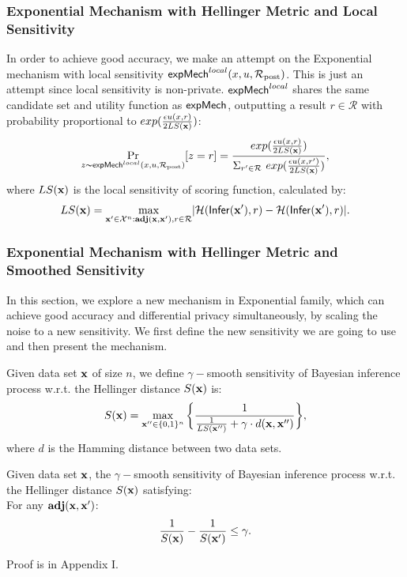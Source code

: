 \documentclass{article}
\begin{document}
\subsubsection{Exponential Mechanism with Hellinger Metric and Local Sensitivity}
\label{subsec_emls}
In order to achieve good accuracy, we make an attempt on the Exponential mechanism with local sensitivity $\mathsf{expMech}^{local}(x,u,\mathcal{R}_{\textup{post}})$. This is just an attempt since local sensitivity is non-private. $\mathsf{expMech}^{local}$ shares the same candidate set and utility function as $\mathsf{expMech}$, outputting a result $r \in \mathcal{R}$ with probability proportional to $exp(\frac{\epsilon u(x,r)}{2 LS(\textbf{x})})$:
\[
\underset{z \thicksim \mathsf{expMech}^{local}(x,u,\mathcal{R}_{\textup{post}})}{\Pr}[z=r] = \frac
{exp(\frac{\epsilon u(x,r)}{2 LS(\textbf{x})})}
{\Sigma_{r' \in \mathcal{R}}\ exp(\frac{\epsilon u(x,r')}{2 LS(\textbf{x})})},
\]
where $LS(\textbf{x})$ is the local sensitivity of scoring function, calculated by:
\begin{equation*}
LS(\textbf{x})=\max_{\textbf{x}' \in \mathcal{X}^n: \\ \textbf{adj}(\textbf{x},\textbf{x}'), r\in \mathcal{R}}\lvert \mathcal{H}(\mathsf{Infer}(\textbf{x}'), r) - \mathcal{H}(\mathsf{Infer}(\textbf{x}'), r)\rvert.
\end{equation*}


\subsubsection{Exponential Mechanism with Hellinger Metric and Smoothed Sensitivity}
\label{subsec_hexpmech}
In this section, we explore a new mechanism in Exponential family, which can achieve good accuracy and differential privacy simultaneously, by scaling the noise to a new sensitivity. We first define the new sensitivity we are going to use and then present the mechanism.
\begin{definition}
\label{def_gamma_smooth}
Given data set $\textbf{x}$ of size $n$, we define $\gamma -$smooth sensitivity of Bayesian inference process w.r.t. the Hellinger distance $S(\textbf{x})$ is:
\begin{equation}
  \label{eq_smooth}
   S(\textbf{x})=\max_{\textbf{x}'' \in \{0,1\}^{n}}\bigg \{ \frac{1}{\frac{1}{LS(\textbf{x}'')} +\gamma \cdot d(\textbf{x},\textbf{x}'')} \bigg \},
\end{equation}
where $d$ is the Hamming distance between two data sets.
\end{definition}

\begin{thm}
\label{thm_gamma_smooth}
Given data set $\textbf{x}$, the $\gamma -$smooth sensitivity of Bayesian inference process w.r.t. the Hellinger distance $S(\textbf{x})$ satisfying:\\
For any $\textbf{adj}(\textbf{x},\textbf{x}')$:
\begin{equation}
\label{eq_gamma_smooth}
\frac{1}{S(\textbf{x})} - \frac{1}{S(\textbf{x}')} \leq \gamma.
\end{equation}

\end{thm}
Proof is in Appendix I.
\end{document}
